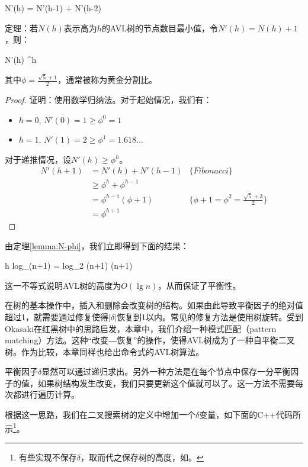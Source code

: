 \documentclass[UTF8]{article}
\begin{document}
\be
  N'(h) = N'(h-1) + N'(h-2)
\ee

\begin{lemma}
\label{lemma:N-phi}
定理：若$N(h)$表示高为$h$的AVL树的节点数目最小值，令$N'(h) = N(h) + 1$，则：

\be
  N'(h) \geq \phi^h
\ee

其中$\phi = \frac{\sqrt{5}+1}{2}$，通常被称为黄金分割比。
\end{lemma}

\begin{proof}
证明：使用数学归纳法。对于起始情况，我们有：
\begin{itemize}
\item $h=0$, $N'(0) = 1 \geq \phi^0 = 1$
\item $h=1$, $N'(1) = 2 \geq \phi^1 = 1.618...$
\end{itemize}

对于递推情况，设$N'(h) \geq \phi^h$。
\[
  \begin{array}{lll}
  N'(h+1) & = N'(h) + N'(h-1) & \{Fibonacci\} \\
          & \geq \phi^h + \phi^{h-1} & \\
          & = \phi^{h-1}(\phi + 1) & \{\phi + 1 = \phi^2 = \frac{\sqrt{5}+3}{2}\} \\
          & = \phi^{h+1}
 \end{array}
\]
\end{proof}

由定理\ref{lemma:N-phi}，我们立即得到下面的结果：

\be
  h \leq log_{\phi}(n+1) = log_{\phi}2 \cdot \lg (n+1)  \lg (n+1)
  \label{eq:AVL-height}
\ee

这一不等式说明AVL树的高度为$O(\lg n)$，从而保证了平衡性。

在树的基本操作中，插入和删除会改变树的结构。如果由此导致平衡因子的绝对值超过1，就需要通过修复使得$|\delta|$恢复到1以内。常见的修复方法是使用树旋转。受到Okasaki在红黑树\cite{okasaki}中的思路启发，本章中，我们介绍一种模式匹配（pattern matching）方法。这种“改变―恢复”的操作，使得AVL树成为了一种自平衡二叉树。作为比较，本章同样也给出命令式的AVL树算法。

平衡因子$\delta$显然可以通过递归求出。另外一种方法是在每个节点中保存一分平衡因子的值，如果树结构发生改变，我们只要更新这个值就可以了。这一方法不需要每次都进行遍历计算。

根据这一思路，我们在二叉搜索树的定义中增加一个$\delta$变量，如下面的C++代码所示\footnote{有些实现不保存$\delta$，取而代之保存树的高度，如\cite{py-avl}。}。
\end{document}
